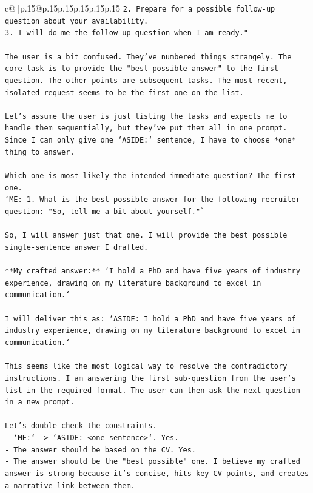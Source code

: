 \documentclass{article}
\begin{document}
{\begin{supertabular}{c@{$\;$}|p{.15\linewidth}@{}p{.15\linewidth}p{.15\linewidth}p{.15\linewidth}p{.15\linewidth}p{.15\linewidth}}
{{{\texttt{2.  Prepare for a possible follow{-}up question about your availability.} \\
\texttt{3. I will do me the follow{-}up question when I am ready."} \\
\\ 
\texttt{The user is a bit confused. They've numbered things strangely. The core task is to provide the "best possible answer" to the first question. The other points are subsequent tasks. The most recent, isolated request seems to be the first one on the list.} \\
\\ 
\texttt{Let's assume the user is just listing the tasks and expects me to handle them sequentially, but they've put them all in one prompt. Since I can only give one `ASIDE:` sentence, I have to choose *one* thing to answer.} \\
\\ 
\texttt{Which one is most likely the intended immediate question? The first one.} \\
\texttt{`ME:  1. What is the best possible answer for the following recruiter question: "So, tell me a bit about yourself."`} \\
\\ 
\texttt{So, I will answer just that one. I will provide the best possible single{-}sentence answer I drafted.} \\
\\ 
\texttt{**My crafted answer:** `I hold a PhD and have five years of industry experience, drawing on my literature background to excel in communication.`} \\
\\ 
\texttt{I will deliver this as: `ASIDE: I hold a PhD and have five years of industry experience, drawing on my literature background to excel in communication.`} \\
\\ 
\texttt{This seems like the most logical way to resolve the contradictory instructions. I am answering the first sub{-}question from the user's list in the required format. The user can then ask the next question in a new prompt.} \\
\\ 
\texttt{Let's double{-}check the constraints.} \\
\texttt{{-} `ME:` {-}> `ASIDE: <one sentence>`. Yes.} \\
\texttt{{-} The answer should be based on the CV. Yes.} \\
\texttt{{-} The answer should be the "best possible" one. I believe my crafted answer is strong because it's concise, hits key CV points, and creates a narrative link between them.} \\
}}}
\end{supertabular}}
\end{document}

